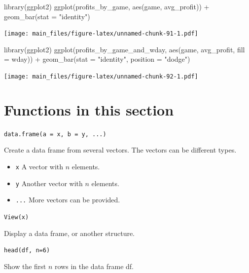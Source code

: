 \documentclass[
]{book}
\newenvironment{Shaded}{\begin{snugshade}}{\end{snugshade}}
\newcommand{\AttributeTok}[1]{\textcolor[rgb]{0.77,0.63,0.00}{#1}}
\newcommand{\FunctionTok}[1]{\textcolor[rgb]{0.00,0.00,0.00}{#1}}
\newcommand{\NormalTok}[1]{#1}
\newcommand{\SpecialCharTok}[1]{\textcolor[rgb]{0.00,0.00,0.00}{#1}}
\newcommand{\StringTok}[1]{\textcolor[rgb]{0.31,0.60,0.02}{#1}}
\providecommand{\tightlist}{%
  \setlength{\itemsep}{0pt}\setlength{\parskip}{0pt}}
\begin{document}
\begin{Shaded}
\begin{Highlighting}[]
\FunctionTok{library}\NormalTok{(ggplot2)}
\FunctionTok{ggplot}\NormalTok{(profits\_by\_game, }\FunctionTok{aes}\NormalTok{(game, avg\_profit)) }\SpecialCharTok{+} \FunctionTok{geom\_bar}\NormalTok{(}\AttributeTok{stat =} \StringTok{"identity"}\NormalTok{)}
\end{Highlighting}
\end{Shaded}

\texttt{[image: main\_files/figure-latex/unnamed-chunk-91-1.pdf]}

\begin{Shaded}
\begin{Highlighting}[]
\FunctionTok{library}\NormalTok{(ggplot2)}
\FunctionTok{ggplot}\NormalTok{(profits\_by\_game\_and\_wday, }\FunctionTok{aes}\NormalTok{(game, avg\_profit, }\AttributeTok{fill =}\NormalTok{ wday)) }\SpecialCharTok{+} \FunctionTok{geom\_bar}\NormalTok{(}\AttributeTok{stat =} \StringTok{"identity"}\NormalTok{, }\AttributeTok{position =} \StringTok{"dodge"}\NormalTok{)}
\end{Highlighting}
\end{Shaded}

\texttt{[image: main\_files/figure-latex/unnamed-chunk-92-1.pdf]}

\hypertarget{functions-in-this-section}{%
\section{Functions in this section}\label{functions-in-this-section}}

\texttt{data.frame(a\ =\ x,\ b\ =\ y,\ ...)}

Create a data frame from several vectors. The vectors can be different types.

\begin{itemize}
\tightlist
\item
  \texttt{x} A vector with \(n\) elements.
\item
  \texttt{y} Another vector with \(n\) elements.
\item
  \texttt{...} More vectors can be provided.
\end{itemize}

\texttt{View(x)}

Display a data frame, or another structure.

\texttt{head(df,\ n=6)}

Show the first \(n\) rows in the data frame df.
\end{document}
